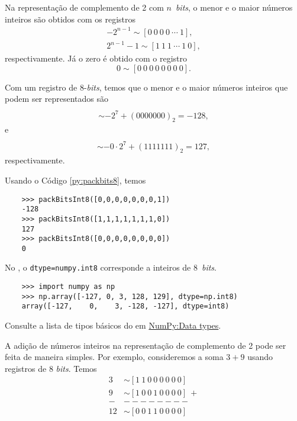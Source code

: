 Na representação de complemento de 2 com $n$~{\it bits}, o menor e o maior números inteiros são obtidos com os registros
\begin{gather}
  -2^{n-1} \sim [0 ~ 0 ~ 0 ~ 0 ~ \cdots ~ 1],\\
  2^{n-1}-1 \sim [1 ~ 1 ~ 1 ~ \cdots ~ 1 ~ 0],
\end{gather}
respectivamente. Já o zero é obtido com o registro
\begin{equation}
  0 \sim [0 ~ 0 ~ 0 ~ 0 ~ 0 ~ 0 ~ 0 ~ 0].
\end{equation}

\begin{ex}
  Com um registro de $8$-{\it bits}, temos que o menor e o maior números inteiros que podem ser representados são
  \begin{gather}
    [0 ~ 0 ~ 0 ~ 0 ~ 0 ~ 0 ~ 0 ~ 1] \\
    \sim -2^{7} + (0000000)_2 = -128,
  \end{gather}
  e
  \begin{gather}
    [1 ~ 1 ~ 1 ~ 1 ~ 1 ~ 1 ~ 1 ~ 0] \\
    \sim -0\cdot 2^7 + (1111111)_2 = 127,
  \end{gather}
  respectivamente.

  \ifispython
  Usando o Código \ref{py:packbits8}, temos
  \begin{lstlisting}
    >>> packBitsInt8([0,0,0,0,0,0,0,1])
    -128
    >>> packBitsInt8([1,1,1,1,1,1,1,0])
    127
    >>> packBitsInt8([0,0,0,0,0,0,0,0])
    0
  \end{lstlisting}
  \fi
\end{ex}

\begin{obs}
  \ifispython
  No {\numpy}, o \lstinline+dtype=numpy.int8+ corresponde a inteiros de 8~{\it bits}.
  \begin{lstlisting}
    >>> import numpy as np
    >>> np.array([-127, 0, 3, 128, 129], dtype=np.int8)
    array([-127,    0,    3, -128, -127], dtype=int8)
  \end{lstlisting}
  Consulte a lista de tipos básicos do {\numpy} em \href{https://numpy.org/doc/stable/user/basics.types.html}{NumPy:Data types}.
  \fi
\end{obs}

A adição de números inteiros na representação de complemento de 2 pode ser feita de maneira simples. Por exemplo, consideremos a soma $3 + 9$ usando registros de 8 {\it bits}. Temos
\begin{align}
  3 &\sim [1 ~ 1 ~ 0 ~ 0 ~ 0 ~ 0 ~ 0 ~ 0]\\
  9 &\sim [1 ~ 0 ~ 0 ~ 1 ~ 0 ~ 0 ~ 0 ~ 0] ~ + \\
  - & -------- \\
 12 &\sim [0 ~ 0 ~ 1 ~ 1 ~ 0 ~ 0 ~ 0 ~ 0]
\end{align}

